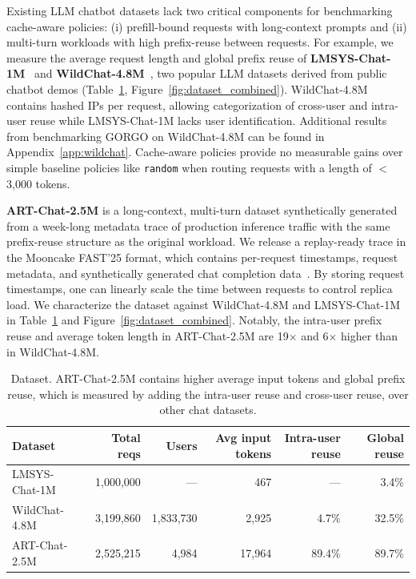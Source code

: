 \documentclass{article}
\begin{document}
Existing LLM chatbot datasets lack two critical components for benchmarking
cache-aware policies: (i) prefill-bound requests with long-context prompts and
(ii) multi-turn workloads with high prefix-reuse between requests. For example,
we measure the average request length and global prefix reuse of
\textbf{LMSYS-Chat-1M}~\citep{lmsys2024} and \textbf{WildChat-4.8M}~\citep{wildchat2024},
two popular LLM datasets derived from public chatbot demos
(Table~\ref{tab:datasets}, Figure~\ref{fig:dataset_combined}). WildChat-4.8M
contains hashed IPs per request, allowing categorization of cross-user and
intra-user reuse while LMSYS-Chat-1M lacks user identification. Additional
results from benchmarking GORGO on WildChat-4.8M can be found in
Appendix~\ref{app:wildchat}. Cache-aware policies provide no measurable gains
over simple baseline policies like \texttt{random} when routing requests with a
length of $<$3{,}000 tokens.

\textbf{ART-Chat-2.5M} is a long-context, multi-turn dataset synthetically generated from
a week-long metadata trace of production inference traffic with the same
prefix-reuse structure as the original workload. We release a replay-ready trace
in the Mooncake FAST'25 format, which contains per-request timestamps, request
metadata, and synthetically generated chat completion data~\citep{qin2024mooncake}.
By storing request timestamps, one can linearly scale the time between requests
to control replica load. We characterize the dataset against WildChat-4.8M and
LMSYS-Chat-1M in Table~\ref{tab:datasets} and Figure~\ref{fig:dataset_combined}.
Notably, the intra-user prefix reuse and average token length in ART-Chat-2.5M
are 19$\times$ and 6$\times$ higher than in WildChat-4.8M.

\begin{table}[t]
\centering
\small
\caption{Dataset. ART-Chat-2.5M contains higher average input tokens and global prefix reuse, which is measured by
adding the intra-user reuse and cross-user reuse, over other chat datasets.
}
\label{tab:datasets}
\begin{tabular}{lrrrrr}
\toprule
Dataset & Total reqs & Users & Avg input tokens & Intra-user reuse & Global reuse \\
\midrule
LMSYS-Chat-1M & 1{,}000{,}000 & --- & 467 & --- & 3.4\% \\
WildChat-4.8M & 3{,}199{,}860 & 1{,}833{,}730 & 2{,}925 & 4.7\% & 32.5\% \\
ART-Chat-2.5M & 2{,}525{,}215 & 4{,}984 & 17{,}964 & 89.4\% & 89.7\% \\
\bottomrule
\end{tabular}
\end{table}
\end{document}
